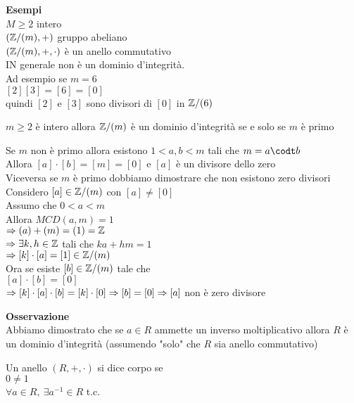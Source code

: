 \documentclass[12px]{article}
\begin{document}
{\begin{defi}
   \end{defi}
\textbf{Esempi}\\
$M\geq 2$ intero\\
 $(\mathbb{Z}/(m), + )$ gruppo abeliano\\
$(\mathbb{Z}/(m), + , \cdot)$ è un anello commutativo\\
IN generale non è un dominio d'integrità.\\
Ad esempio se  $m=6 $\\
$[2][3]=[6]=[0]$\\
quindi  $[2]$ e $[3]$ sono divisori di $[0]$ in $\mathbb{Z}/(6)$
\begin{prop}
	$m\geq 2 $ è intero allora $\mathbb{Z}/(m)$ è un dominio d'integrità se e solo se $m$ è primo
\end{prop}
\begin{dimo}
	Se $m$ non è primo allora esistono $1<a,b < m$ tali che $m = a\codt b$\\
	Allora  $[a]\cdot[b] = [m] = [0]$ e  $[a]$ è un divisore dello zero\\
	Viceversa se $m$ è primo dobbiamo dimostrare che non esistono zero divisori \\
	Considero $[a]\in\mathbb{Z}/(m)$ con $[a]\neq [0]$\\
	Assumo che  $0< a < m$ \\
	Allora $MCD(a,m) = 1$\\
	$ \Rightarrow (a) + (m) = (1) =\mathbb{Z}$ \\
	$ \Rightarrow \exists k,h\in \mathbb{Z}$ tali che $ka + hm = 1$\\
	$ \Rightarrow [k]\cdot [a] = [1]\in \mathbb{Z}/(m)$\\
	Ora se esiste $[b]\in \mathbb{Z}/(m)$ tale che\\
	$[a]\cdot[b] = [0]$\\
	$ \Rightarrow [k]\cdot[a]\cdot[b] = [k]\cdot [0]\\
	\Rightarrow [b] = [0]\\
	\Rightarrow  [a]$  non è zero divisore
\end{dimo}
\textbf{Osservazione}\\
Abbiamo dimostrato che se $a\in R$ ammette un inverso moltiplicativo allora  $R$ è un dominio d'integrità (assumendo "solo" che $R$ sia anello commutativo)\\
\begin{defi}
	Un anello $(R,+, \cdot)$ si dice corpo se\\
	 $0\neq 1$\\
	 $\forall a\in R, \ \exists a^{-1}\in R$ t.c.\\

\end{defi}}
\end{document}
